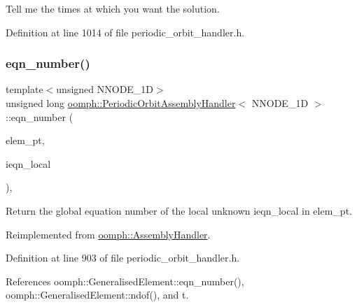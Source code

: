 Tell me the times at which you want the solution. 



Definition at line 1014 of file periodic\+\_\+orbit\+\_\+handler.\+h.

\mbox{\label{classoomph_1_1PeriodicOrbitAssemblyHandler_ac4d1e4e7e566061c2129157c67adab5b}} 
\subsubsection{\texorpdfstring{eqn\+\_\+number()}{eqn\_number()}}
{\footnotesize\ttfamily template$<$unsigned N\+N\+O\+D\+E\+\_\+1D$>$ \\
unsigned long \hyperlink{classoomph_1_1PeriodicOrbitAssemblyHandler}{oomph\+::\+Periodic\+Orbit\+Assembly\+Handler}$<$ N\+N\+O\+D\+E\+\_\+1D $>$\+::eqn\+\_\+number (\begin{DoxyParamCaption}\item[{\hyperlink{classoomph_1_1GeneralisedElement}{Generalised\+Element} $\ast$const \&}]{elem\+\_\+pt,  }\item[{const unsigned \&}]{ieqn\+\_\+local }\end{DoxyParamCaption})\hspace{0.3cm}{\ttfamily [inline]}, {\ttfamily [virtual]}}



Return the global equation number of the local unknown ieqn\+\_\+local in elem\+\_\+pt. 



Reimplemented from \hyperlink{classoomph_1_1AssemblyHandler_a94d28e2de2559cde803d1ba2195b5290}{oomph\+::\+Assembly\+Handler}.



Definition at line 903 of file periodic\+\_\+orbit\+\_\+handler.\+h.



References oomph\+::\+Generalised\+Element\+::eqn\+\_\+number(), oomph\+::\+Generalised\+Element\+::ndof(), and t.

\mbox{\label{classoomph_1_1PeriodicOrbitAssemblyHandler_a9e8d41c8ad79134466a1a50c11c62dc3}} 
